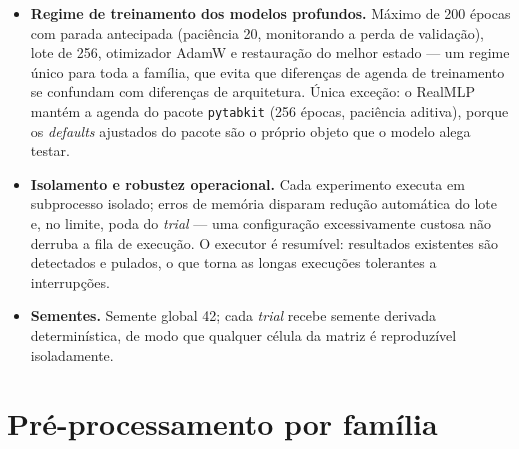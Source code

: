 \begin{itemize}
    aprendizado profundo foram ajustados com 100
    \emph{trials}, e não 25 (os GBDTs usam 100 em todo o estudo; o
    TabPFN é \emph{zero-shot}), e os resultados foram mantidos como
    âncora de validação, de modo que,
    nesse único conjunto, as arquiteturas legadas tiveram 4$\times$ o
    orçamento de KAN/TabKAN; o conjunto é excluído dos agregados de
    custo de tuning, e a direção do viés (a favor das legadas, que ainda
    assim não vencem os GBDTs ali) não toca nenhuma conclusão. Os GBDTs
    usam parada antecipada interna (50 rodadas sobre conjunto de
    validação), simétrica em espírito à parada dos modelos profundos. Os
    espaços de busca por modelo estão no Apêndice~\ref{app:espacos-busca},
    e os valores efetivamente escolhidos por conjunto, no
    Apêndice~\ref{app:hp-escolhidos} --- alguns encostam na borda do
    espaço (p.~ex., \texttt{n\_estimators} próximo do teto de 2.000),
    limitação declarada do desenho do espaço.
    A direção de otimização segue a métrica primária de cada tarefa
    (maximização de ROC-AUC; minimização de \emph{log-loss} e RMSE;
    Seção~\ref{sec:met-metricas}).
  \item \textbf{Regime de treinamento dos modelos profundos.} Máximo de 200
    épocas com parada antecipada (paciência 20, monitorando a perda de
    validação), lote de 256, otimizador AdamW e restauração do melhor
    estado --- um regime único para toda a família, que evita que
    diferenças de agenda de treinamento se confundam com diferenças de
    arquitetura. Única exceção: o RealMLP mantém a agenda do pacote
    \texttt{pytabkit} (256 épocas, paciência aditiva), porque os
    \emph{defaults} ajustados do pacote são o próprio objeto que o
    modelo alega testar.
  \item \textbf{Isolamento e robustez operacional.} Cada experimento executa
    em subprocesso isolado; erros de memória disparam redução automática do
    lote e, no limite, poda do \emph{trial} --- uma configuração
    excessivamente custosa não derruba a fila de execução. O executor é
    resumível: resultados existentes são detectados e pulados, o que torna
    as longas execuções tolerantes a interrupções.
  \item \textbf{Sementes.} Semente global 42; cada \emph{trial} recebe
    semente derivada determinística, de modo que qualquer célula da matriz é
    reproduzível isoladamente.
\end{itemize}

\section{Pré-processamento por família}
\label{sec:met-preproc}

